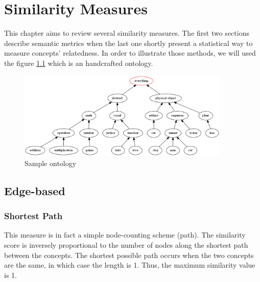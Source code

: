 
\chapter{Similarity Measures} %

\label{chapter:Measures} %


This chapter aims to review several similarity measures. The first two sections describe semantic metrics when the last one shortly present a statistical way to measure concepts' relatedness. In order to illustrate those methods, we will used the figure \ref{fig:ontology} which is an handcrafted ontology.

\begin{figure}[!h]
\begin{center}
\includegraphics[width=0.90\textwidth]{./Primitives/ontology-handcraft-example.png}
\end{center}
\caption{Sample ontology}
\label{fig:ontology}
\end{figure}


\section{Edge-based}

\subsection{Shortest Path} %
\label{ssub:shortest_path}
This measure is in fact a simple node-counting scheme (path). The similarity score is inversely proportional to the number of nodes along the shortest path between the concepts. The shortest possible path occurs when the two concepts are the same, in which case the length is 1. Thus, the maximum similarity value is 1.\\

